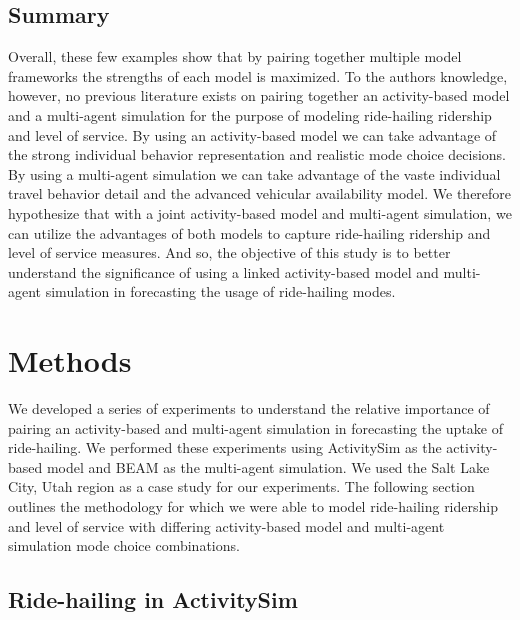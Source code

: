 \documentclass[fancy, masters]{byuthesis}
\begin{document}
\hypertarget{summary}{%
\section{Summary}\label{summary}}

Overall, these few examples show that by pairing together multiple model frameworks the strengths of each model is maximized. To the authors knowledge, however, no previous literature exists on pairing together an activity-based model and a multi-agent simulation for the purpose of modeling ride-hailing ridership and level of service. By using an activity-based model we can take advantage of the strong individual behavior representation and realistic mode choice decisions. By using a multi-agent simulation we can take advantage of the vaste individual travel behavior detail and the advanced vehicular availability model. We therefore hypothesize that with a joint activity-based model and multi-agent simulation, we can utilize the advantages of both models to capture ride-hailing ridership and level of service measures. And so, the objective of this study is to better understand the significance of using a linked activity-based model and multi-agent simulation in forecasting the usage of ride-hailing modes.

\hypertarget{meth}{%
\chapter{Methods}\label{meth}}

We developed a series of experiments to understand the relative importance of pairing an activity-based and multi-agent simulation in forecasting the uptake of ride-hailing. We performed these experiments using ActivitySim as the activity-based model and BEAM as the multi-agent simulation. We used the Salt Lake City, Utah region as a case study for our experiments. The following section outlines the methodology for which we were able to model ride-hailing ridership and level of service with differing activity-based model and multi-agent simulation mode choice combinations.

\hypertarget{ride-hailing-in-activitysim}{%
\section{Ride-hailing in ActivitySim}\label{ride-hailing-in-activitysim}}
\end{document}
